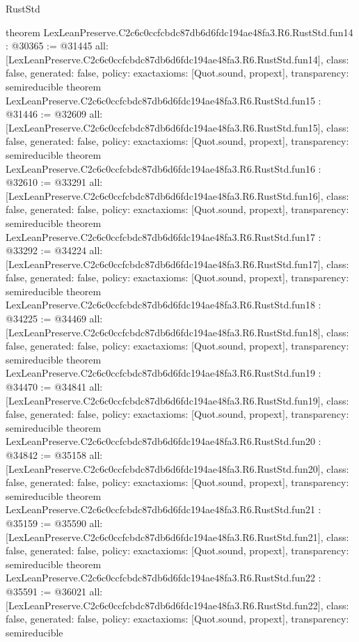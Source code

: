 \begin{lexlean}{RustStd}
\begin{coremodule}
{}
theorem LexLeanPreserve.C2c6c0ccfcbdc87db6d6fdc194ae48fa3.R6.RustStd.fun14 : @30365 := @31445 {
  all: [LexLeanPreserve.C2c6c0ccfcbdc87db6d6fdc194ae48fa3.R6.RustStd.fun14],
  class: false,
  generated: false,
  policy: exact{axioms: [Quot.sound, propext]},
  transparency: semireducible
}
theorem LexLeanPreserve.C2c6c0ccfcbdc87db6d6fdc194ae48fa3.R6.RustStd.fun15 : @31446 := @32609 {
  all: [LexLeanPreserve.C2c6c0ccfcbdc87db6d6fdc194ae48fa3.R6.RustStd.fun15],
  class: false,
  generated: false,
  policy: exact{axioms: [Quot.sound, propext]},
  transparency: semireducible
}
theorem LexLeanPreserve.C2c6c0ccfcbdc87db6d6fdc194ae48fa3.R6.RustStd.fun16 : @32610 := @33291 {
  all: [LexLeanPreserve.C2c6c0ccfcbdc87db6d6fdc194ae48fa3.R6.RustStd.fun16],
  class: false,
  generated: false,
  policy: exact{axioms: [Quot.sound, propext]},
  transparency: semireducible
}
theorem LexLeanPreserve.C2c6c0ccfcbdc87db6d6fdc194ae48fa3.R6.RustStd.fun17 : @33292 := @34224 {
  all: [LexLeanPreserve.C2c6c0ccfcbdc87db6d6fdc194ae48fa3.R6.RustStd.fun17],
  class: false,
  generated: false,
  policy: exact{axioms: [Quot.sound, propext]},
  transparency: semireducible
}
theorem LexLeanPreserve.C2c6c0ccfcbdc87db6d6fdc194ae48fa3.R6.RustStd.fun18 : @34225 := @34469 {
  all: [LexLeanPreserve.C2c6c0ccfcbdc87db6d6fdc194ae48fa3.R6.RustStd.fun18],
  class: false,
  generated: false,
  policy: exact{axioms: [Quot.sound, propext]},
  transparency: semireducible
}
theorem LexLeanPreserve.C2c6c0ccfcbdc87db6d6fdc194ae48fa3.R6.RustStd.fun19 : @34470 := @34841 {
  all: [LexLeanPreserve.C2c6c0ccfcbdc87db6d6fdc194ae48fa3.R6.RustStd.fun19],
  class: false,
  generated: false,
  policy: exact{axioms: [Quot.sound, propext]},
  transparency: semireducible
}
theorem LexLeanPreserve.C2c6c0ccfcbdc87db6d6fdc194ae48fa3.R6.RustStd.fun20 : @34842 := @35158 {
  all: [LexLeanPreserve.C2c6c0ccfcbdc87db6d6fdc194ae48fa3.R6.RustStd.fun20],
  class: false,
  generated: false,
  policy: exact{axioms: [Quot.sound, propext]},
  transparency: semireducible
}
theorem LexLeanPreserve.C2c6c0ccfcbdc87db6d6fdc194ae48fa3.R6.RustStd.fun21 : @35159 := @35590 {
  all: [LexLeanPreserve.C2c6c0ccfcbdc87db6d6fdc194ae48fa3.R6.RustStd.fun21],
  class: false,
  generated: false,
  policy: exact{axioms: [Quot.sound, propext]},
  transparency: semireducible
}
theorem LexLeanPreserve.C2c6c0ccfcbdc87db6d6fdc194ae48fa3.R6.RustStd.fun22 : @35591 := @36021 {
  all: [LexLeanPreserve.C2c6c0ccfcbdc87db6d6fdc194ae48fa3.R6.RustStd.fun22],
  class: false,
  generated: false,
  policy: exact{axioms: [Quot.sound, propext]},
  transparency: semireducible
}
\end{coremodule}
\end{lexlean}
